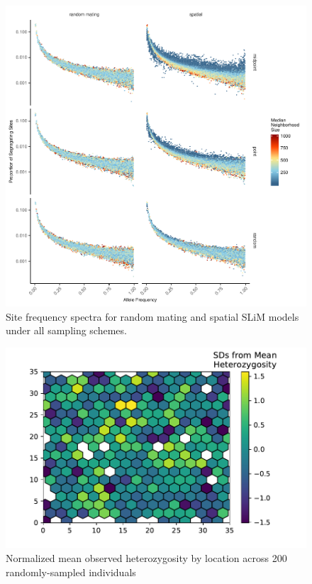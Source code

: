 \documentclass[11pt,twoside,lineno]{preprint}
\begin{document}
\afterpage{\clearpage}
\begin{figure}[p]
\centering
\includegraphics[width=\textwidth]{figures/fig_S1_sfs_grid_model_by_sampling.pdf}
\caption{Site frequency spectra for random mating and spatial SLiM models under all sampling schemes.}
\label{fig:allsfs}
\end{figure}

\afterpage{\clearpage}
\begin{figure}[p]
\centering
\includegraphics[]{figures/het_z_by_ind.pdf}
\caption{Normalized mean observed heterozygosity by location across 200 randomly-sampled individuals}
\label{fig:hetmap}
\end{figure}
\end{document}
